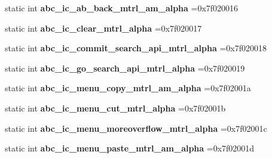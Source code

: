 \begin{DoxyCompactItemize}
\item 
\mbox{\label{classandroid_1_1support_1_1v4_1_1R_1_1drawable_a950156a57acd82b0e1bb47d8e2711f8d}} 
static int {\bfseries abc\+\_\+ic\+\_\+ab\+\_\+back\+\_\+mtrl\+\_\+am\+\_\+alpha} =0x7f020016
\item 
\mbox{\label{classandroid_1_1support_1_1v4_1_1R_1_1drawable_aaa820c48267b55bb516a0e739e38a9dc}} 
static int {\bfseries abc\+\_\+ic\+\_\+clear\+\_\+mtrl\+\_\+alpha} =0x7f020017
\item 
\mbox{\label{classandroid_1_1support_1_1v4_1_1R_1_1drawable_adc606d8c7a2f9c66346d9bdfbc96e26b}} 
static int {\bfseries abc\+\_\+ic\+\_\+commit\+\_\+search\+\_\+api\+\_\+mtrl\+\_\+alpha} =0x7f020018
\item 
\mbox{\label{classandroid_1_1support_1_1v4_1_1R_1_1drawable_ac5a4507380f4c3337e80e6aa90995ea1}} 
static int {\bfseries abc\+\_\+ic\+\_\+go\+\_\+search\+\_\+api\+\_\+mtrl\+\_\+alpha} =0x7f020019
\item 
\mbox{\label{classandroid_1_1support_1_1v4_1_1R_1_1drawable_ac87101d80d7363b2b24cf3364789c807}} 
static int {\bfseries abc\+\_\+ic\+\_\+menu\+\_\+copy\+\_\+mtrl\+\_\+am\+\_\+alpha} =0x7f02001a
\item 
\mbox{\label{classandroid_1_1support_1_1v4_1_1R_1_1drawable_a39e5151fc860f8595616bbbf1f219fcb}} 
static int {\bfseries abc\+\_\+ic\+\_\+menu\+\_\+cut\+\_\+mtrl\+\_\+alpha} =0x7f02001b
\item 
\mbox{\label{classandroid_1_1support_1_1v4_1_1R_1_1drawable_a5e5c1833955f5679cf4baa6641e67ac1}} 
static int {\bfseries abc\+\_\+ic\+\_\+menu\+\_\+moreoverflow\+\_\+mtrl\+\_\+alpha} =0x7f02001c
\item 
\mbox{\label{classandroid_1_1support_1_1v4_1_1R_1_1drawable_aa9cf0bec9a0b30680b9df2e07655a524}} 
static int {\bfseries abc\+\_\+ic\+\_\+menu\+\_\+paste\+\_\+mtrl\+\_\+am\+\_\+alpha} =0x7f02001d

\end{DoxyCompactItemize}
